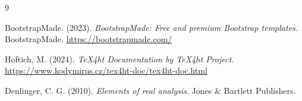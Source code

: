 \documentclass[fleqn,oneside]{article}
\begin{document}
%
\begin{thebibliography}{9}

	BootstrapMade. (2023). \textit{BootstrapMade: Free and premium Bootstrap templates}. BootstrapMade. \url{https://bootstrapmade.com/}

	Hoftich, M. (2024). \textit{TeX4ht Documentation by TeX4ht Project}. \url{https://www.kodymirus.cz/tex4ht-doc/tex4ht-doc.html}

	Denlinger, C. G. (2010). \textit{Elements of real analysis}. Jones \& Bartlett Publishers.



\end{thebibliography}

%
\end{document}
